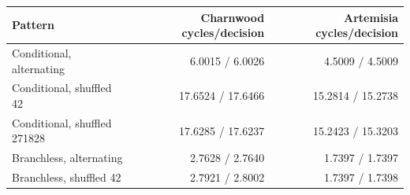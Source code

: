 \begin{tabular}{lrr}
\toprule
Pattern & Charnwood cycles/decision & Artemisia cycles/decision \\
\midrule
Conditional, alternating & 6.0015 / 6.0026 & 4.5009 / 4.5009 \\
Conditional, shuffled 42 & 17.6524 / 17.6466 & 15.2814 / 15.2738 \\
Conditional, shuffled 271828 & 17.6285 / 17.6237 & 15.2423 / 15.3203 \\
Branchless, alternating & 2.7628 / 2.7640 & 1.7397 / 1.7397 \\
Branchless, shuffled 42 & 2.7921 / 2.8002 & 1.7397 / 1.7398 \\
\bottomrule
\end{tabular}

